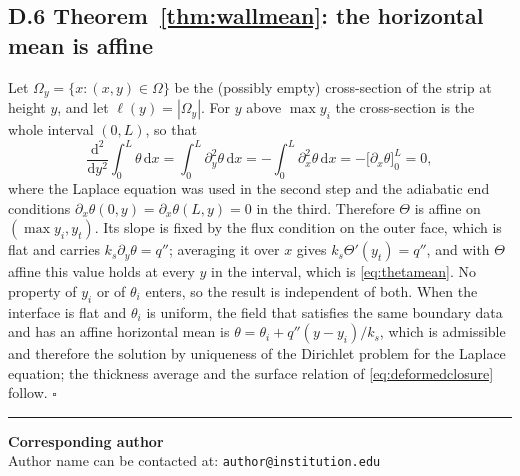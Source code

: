 \documentclass[11pt,a4paper]{article}
\newcommand{\dd}{\mathrm{d}}
\begin{document}
\subsection*{D.6 Theorem~\ref{thm:wallmean}: the horizontal mean is affine}

Let $\Omega_y=\{x:(x,y)\in\Omega\}$ be the (possibly empty) cross-section of the strip at height
$y$, and let $\ell(y)=|\Omega_y|$. For $y$ above $\max y_i$ the cross-section is the whole
interval $(0,L)$, so that
\begin{equation}
\frac{\dd^2}{\dd y^2}\int_0^L\theta\,\dd x
=\int_0^L\partial_y^2\theta\,\dd x
=-\int_0^L\partial_x^2\theta\,\dd x
=-\bigl[\partial_x\theta\bigr]_0^L=0 ,
\label{eq:D10}
\end{equation}
where the Laplace equation was used in the second step and the adiabatic end conditions
$\partial_x\theta(0,y)=\partial_x\theta(L,y)=0$ in the third. Therefore $\Theta$ is affine on
$(\max y_i,y_t)$. Its slope is fixed by the flux condition on the outer face, which is flat and
carries $k_s\partial_y\theta=q''$; averaging it over $x$ gives $k_s\Theta'(y_t)=q''$, and with
$\Theta$ affine this value holds at every $y$ in the interval, which is \eqref{eq:thetamean}.
No property of $y_i$ or of $\theta_i$ enters, so the result is independent of both. When the
interface is flat and $\theta_i$ is uniform, the field that satisfies the same boundary data and
has an affine horizontal mean is $\theta=\theta_i+q''(y-y_i)/k_s$, which is admissible and
therefore the solution by uniqueness of the Dirichlet problem for the Laplace equation; the
thickness average and the surface relation of \eqref{eq:deformedclosure} follow. $\square$

\vspace{10pt}
\noindent\rule{\textwidth}{0.4pt}

\noindent\textbf{Corresponding author}\\[2pt]
\noindent Author name can be contacted at: \texttt{author@institution.edu}
\end{document}
